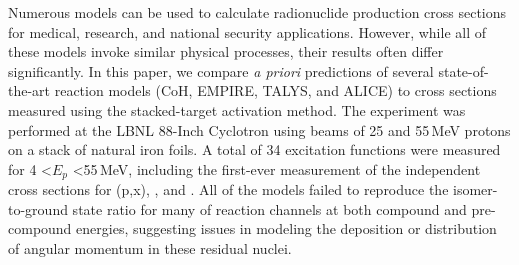 



Numerous models can be used to calculate radionuclide production cross sections for medical, research, and national security applications. 
However, while all of these models invoke similar physical processes, their results often differ significantly.  
In this paper, we compare \emph{a priori} predictions of several state-of-the-art reaction models (CoH, EMPIRE, TALYS, and ALICE) to cross sections measured using the stacked-target activation method.  
The experiment was performed at the LBNL 88-Inch Cyclotron using beams of 25 and 55\,MeV protons on a stack of natural iron foils.  
A total of 34 excitation functions were measured for 4 \textless $E_p$ \textless 55\,MeV, including the first-ever measurement of the independent cross sections for (p,x), , and .  
All of the models failed to reproduce the isomer-to-ground state ratio for many of reaction channels at both compound and pre-compound energies, suggesting issues in modeling the deposition or distribution of angular momentum in these residual nuclei.  



